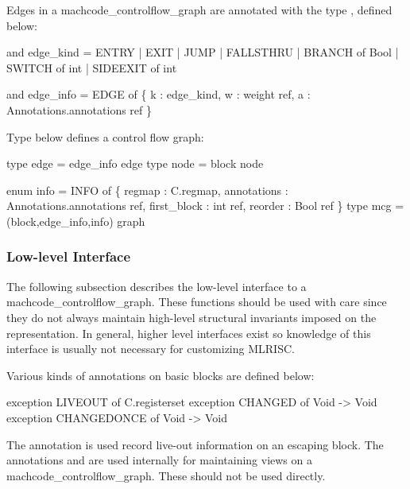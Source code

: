 Edges in a machcode_controlflow_graph are annotated with the type ,
defined below:
\begin{SML}
   and edge_kind = ENTRY           
                 | EXIT           
                 | JUMP          
                 | FALLSTHRU     
                 | BRANCH of Bool
                 | SWITCH of int 
                 | SIDEEXIT of int 

   and edge_info = 
       EDGE of \{ k : edge_kind,                 
                 w : weight ref,               
                 a : Annotations.annotations ref
               \}
\end{SML}

Type  below defines a control flow graph:
\begin{SML}
   type edge = edge_info edge
   type node = block node

   enum info = 
       INFO of \{ regmap     : C.regmap,
                 annotations : Annotations.annotations ref,
                 first_block : int ref,
                 reorder     : Bool ref
               \}
   type mcg = (block,edge_info,info) graph
\end{SML}

\subsubsection{Low-level Interface}
   The following subsection describes the low-level interface to a machcode_controlflow_graph.
These functions should be used with care since they do not
always maintain high-level structural invariants imposed on
the representation.  In general, higher level interfaces exist
so knowledge of this interface is usually not necessary for customizing
MLRISC. 
   
   Various kinds of annotations on basic blocks are defined below:
\begin{SML}
   exception LIVEOUT of C.registerset   
   exception CHANGED of Void -> Void
   exception CHANGEDONCE of Void -> Void
\end{SML}
The annotation  is used record live-out information
on an escaping block.
The annotations  and  are used
internally for maintaining views on a machcode_controlflow_graph.  These should not be used
directly. 

